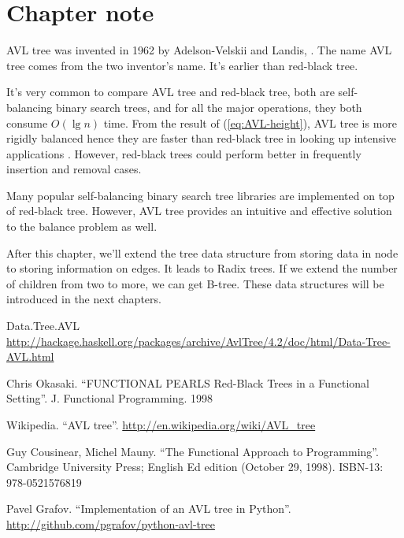 \documentclass{article}
\begin{document}
\section{Chapter note}
AVL tree was invented in 1962 by Adelson-Velskii and Landis\cite{wiki},
\cite{TFATP}. The name AVL tree comes from the two inventor's name. It's earlier than red-black tree.

It's very common to compare AVL tree and red-black tree, both are self-balancing binary search trees, and for all the major operations, they both consume $O(\lg n)$ time. From the result of (\ref{eq:AVL-height}), AVL tree is more rigidly balanced hence they are faster than red-black tree in looking up intensive applications \cite{wiki}. However, red-black trees could perform better in frequently insertion and removal cases.

Many popular self-balancing binary search tree libraries are implemented on top of red-black tree. However, AVL tree provides an intuitive and effective solution to the balance problem as well.

After this chapter, we'll extend the tree data structure from storing data in node to storing information on edges. It leads to Radix trees. If we extend the number of children from two to more, we can get B-tree. These data structures will be introduced in the next chapters.

\begin{thebibliography}{99}

Data.Tree.AVL \url{http://hackage.haskell.org/packages/archive/AvlTree/4.2/doc/html/Data-Tree-AVL.html}

Chris Okasaki. ``FUNCTIONAL PEARLS Red-Black Trees in a Functional Setting''. J. Functional Programming. 1998

Wikipedia. ``AVL tree''. \url{http://en.wikipedia.org/wiki/AVL_tree}

Guy Cousinear, Michel Mauny. ``The Functional Approach to Programming''. Cambridge University Press; English Ed edition (October 29, 1998). ISBN-13: 978-0521576819

Pavel Grafov. ``Implementation of an AVL tree in Python''. \url{http://github.com/pgrafov/python-avl-tree}
\end{thebibliography}

\ifx\wholebook\relax\else
\end{document}
